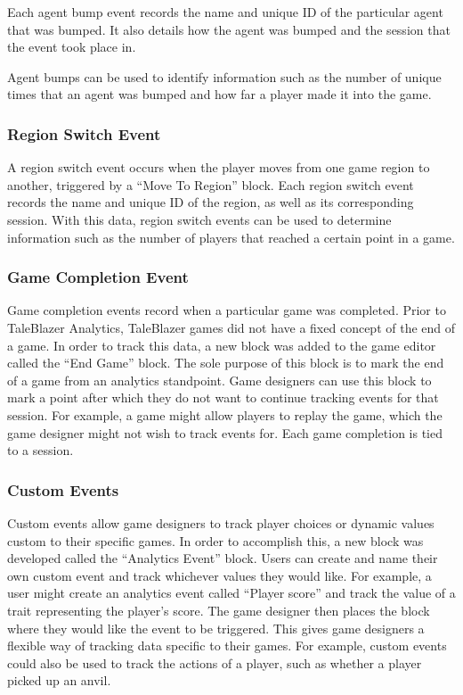 Each agent bump event records the name and unique ID of the particular agent that was bumped. It also details how the agent was bumped and the session that the event took place in. 

Agent bumps can be used to identify information such as the number of unique times that an agent was bumped and how far a player made it into the game. 

\subsubsection{Region Switch Event}

A region switch event occurs when the player moves from one game region to another, triggered by a ``Move To Region'' block. Each region switch event records the name and unique ID of the region, as well as its corresponding session. With this data, region switch events can be used to determine information such as the number of players that reached a certain point in a game.

\subsubsection{Game Completion Event}

Game completion events record when a particular game was completed. Prior to TaleBlazer Analytics, TaleBlazer games did not have a fixed concept of the end of a game. In order to track this data, a new block was added to the game editor called the ``End Game'' block. The sole purpose of this block is to mark the end of a game from an analytics standpoint. Game designers can use this block to mark a point after which they do not want to continue tracking events for that session. For example, a game might allow players to replay the game, which the game designer might not wish to track events for. Each game completion is tied to a session. 

\subsubsection{Custom Events}

Custom events allow game designers to track player choices or dynamic values custom to their specific games. In order to accomplish this, a new block was developed called the ``Analytics Event'' block. Users can create and name their own custom event and track whichever values they would like. For example, a user might create an analytics event called ``Player score'' and track the value of a trait representing the player's score. The game designer then places the block where they would like the event to be triggered. This gives game designers a flexible way of tracking data specific to their games. For example, custom events could also be used to track the actions of a player, such as whether a player picked up an anvil. 


